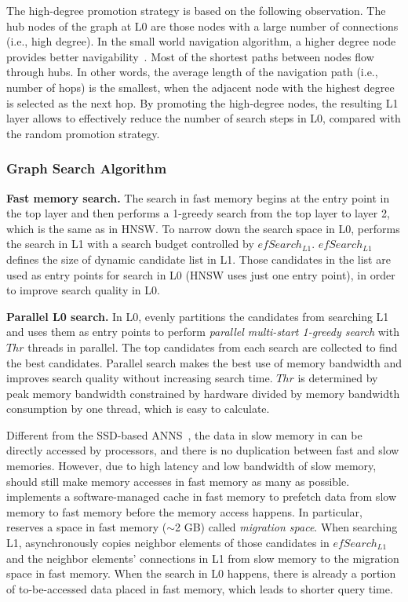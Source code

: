 The high-degree promotion strategy is based on the following observation. The hub nodes of the graph at L0 are those nodes with a large number of connections (i.e., high degree). In the small world navigation algorithm, a higher degree node provides better navigability~\cite{swg}. Most of the shortest paths between nodes flow through hubs. In other words, the average length of the navigation path (i.e., number of hops) is the smallest, when the adjacent node with the highest degree is selected as the next hop. By promoting the high-degree nodes, the resulting L1 layer allows \algoname to effectively reduce the number of search steps in L0, compared with the random promotion strategy.

\subsubsection{\name Graph Search Algorithm}
\label{sec:searching}

\textbf{Fast memory search.} The search in fast memory begins at the entry point in the top layer and then performs a 1-greedy search from the top layer to layer 2, which is the same as in HNSW. To narrow down the search space in L0, \name performs the search in L1 with a search budget controlled by $efSearch_{L1}$. $efSearch_{L1}$ defines the size of dynamic candidate list in L1. Those candidates in the list are used as entry points for search in L0 (HNSW uses just one entry point), in order to improve search quality in L0. 

\textbf{Parallel L0 search.} In L0, \name evenly partitions the candidates from searching L1 and uses them as entry points to perform \emph{parallel multi-start 1-greedy search} with  $Thr$ threads in parallel. The top candidates from each search are collected to find the best candidates. Parallel search makes the best use of memory bandwidth and improves search quality without increasing search time. $Thr$ is determined by peak memory bandwidth constrained by hardware divided by memory bandwidth consumption by one thread, which is easy to calculate. 

Different from the SSD-based ANNS~\cite{diskann,grip}, the data in slow memory in \name can be directly accessed by processors, and there is no duplication between fast and slow memories. However, due to high latency and low bandwidth of slow memory, \name should still make memory accesses in fast memory as many as possible. \name implements a software-managed cache in fast memory to prefetch data from slow memory to fast memory before the memory access happens. In particular, \name reserves a space in fast memory ($\sim$2 GB) called \textit{migration space}. When searching L1, \name asynchronously copies neighbor elements of those candidates in $efSearch_{L1}$ and the neighbor elements' connections in L1 from slow memory to the migration space in fast memory. When the search in L0 happens, there is already a portion of to-be-accessed data placed in fast memory, which leads to shorter query time.
